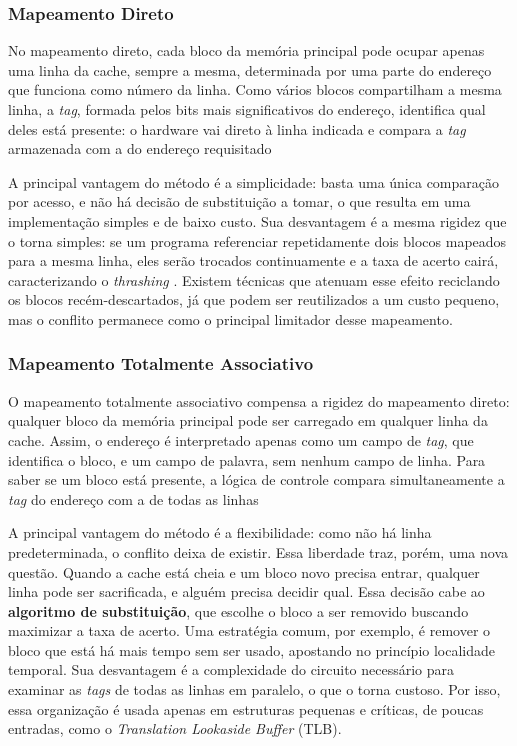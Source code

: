 \documentclass[12pt]{article}
\begin{document}
\subsubsection{Mapeamento Direto}

No mapeamento direto, cada bloco da memória principal pode ocupar apenas
uma linha da cache, sempre a mesma, determinada por uma parte do endereço
que funciona como número da linha. Como vários blocos compartilham a mesma
linha, a \textit{tag}, formada pelos bits mais significativos do endereço,
identifica qual deles está presente: o hardware vai direto à linha indicada
e compara a \textit{tag} armazenada com a do endereço requisitado

A principal vantagem do método é a simplicidade: basta uma única comparação
por acesso, e não há decisão de substituição a tomar, o que resulta em uma
implementação simples e de baixo custo. Sua desvantagem é a mesma rigidez
que o torna simples: se um programa referenciar repetidamente dois blocos
mapeados para a mesma linha, eles serão trocados continuamente e a taxa de
acerto cairá, caracterizando o \textit{thrashing} \cite{stallings2017}. Existem técnicas que
atenuam esse efeito reciclando os blocos recém-descartados, já que podem
ser reutilizados a um custo pequeno, mas o conflito permanece como o
principal limitador desse mapeamento.

\subsubsection{Mapeamento Totalmente Associativo}

O mapeamento totalmente associativo compensa a rigidez do mapeamento
direto: qualquer bloco da memória principal pode ser carregado em qualquer
linha da cache. Assim, o endereço é interpretado apenas como um campo de
\textit{tag}, que identifica o bloco, e um campo de palavra, sem nenhum
campo de linha. Para saber se um bloco está presente, a lógica de controle
compara simultaneamente a \textit{tag} do endereço com a de todas as linhas

A principal vantagem do método é a flexibilidade: como não há linha
predeterminada, o conflito deixa de existir. Essa liberdade traz, porém,
uma nova questão. Quando a cache está cheia e um bloco novo precisa
entrar, qualquer linha pode ser sacrificada, e alguém precisa decidir qual.
Essa decisão cabe ao \textbf{algoritmo de substituição}, que escolhe o
bloco a ser removido buscando maximizar a taxa de acerto. Uma estratégia
comum, por exemplo, é remover o bloco que está há mais tempo sem ser
usado, apostando no princípio localidade temporal. Sua desvantagem é a complexidade
do circuito necessário para examinar as \textit{tags} de todas as linhas
em paralelo, o que o torna custoso. Por isso, essa organização é usada
apenas em estruturas pequenas e críticas, de poucas entradas, como o
\textit{Translation Lookaside Buffer} (TLB).
\end{document}
